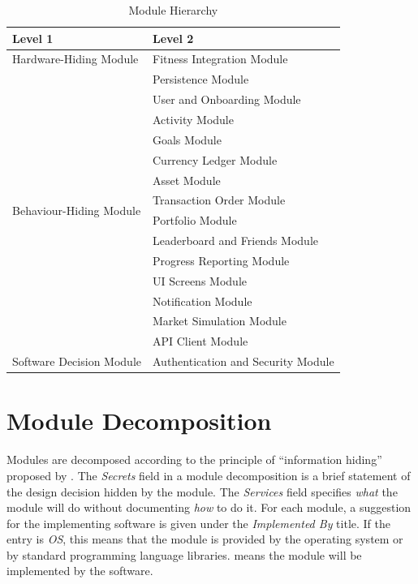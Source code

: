 \documentclass[12pt, titlepage]{article}
\begin{document}
\begin{table}[H]
\centering
\begin{tabular}{p{} p{}}
\toprule
\textbf{Level 1} & \textbf{Level 2}\\
\midrule

Hardware-Hiding Module & Fitness Integration Module\\
\midrule

\multirow{14}{0.3\textwidth}{Behaviour-Hiding Module} & Persistence Module\\
& User and Onboarding Module\\
& Activity Module\\
& Goals Module\\
& Currency Ledger Module\\
& Asset Module\\
& Transaction Order Module\\
& Portfolio Module\\
& Leaderboard and Friends Module\\
& Progress Reporting Module\\
& UI Screens Module\\
& Notification Module\\
& Market Simulation Module\\
& API Client Module\\
\midrule

Software Decision Module & Authentication and Security Module\\
\bottomrule

\end{tabular}
\caption{Module Hierarchy}
\label{TblMH}
\end{table}

\section{Module Decomposition} \label{SecMD}

Modules are decomposed according to the principle of ``information hiding''
proposed by \citet{ParnasEtAl1984}. The \emph{Secrets} field in a module
decomposition is a brief statement of the design decision hidden by the
module. The \emph{Services} field specifies \emph{what} the module will do
without documenting \emph{how} to do it. For each module, a suggestion for the
implementing software is given under the \emph{Implemented By} title. If the
entry is \emph{OS}, this means that the module is provided by the operating
system or by standard programming language libraries.  \emph{\progname{}} means the
module will be implemented by the \progname{} software.
\end{document}
